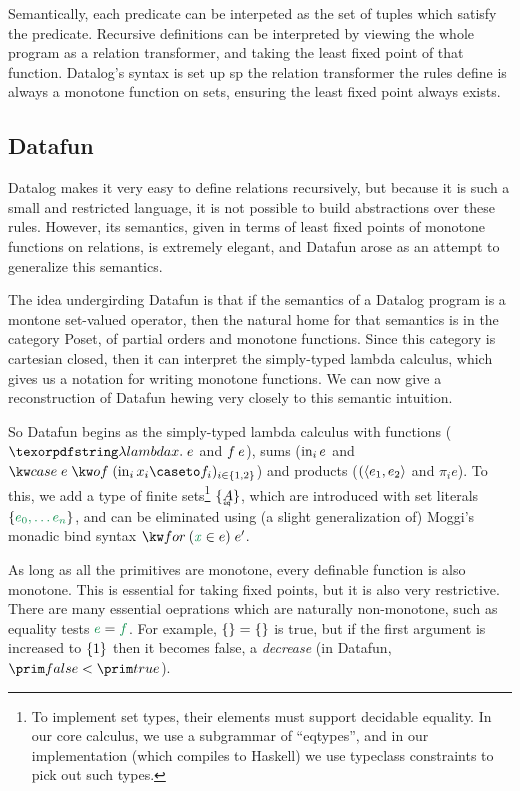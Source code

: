 Semantically, each predicate can be interpeted as the set of tuples
which satisfy the predicate. Recursive definitions can be interpreted
by viewing the whole program as a relation transformer,
and taking the least fixed point of that function. 
Datalog's syntax is set up sp the relation transformer the rules define is
always a monotone function on sets, ensuring the least fixed point
always exists.

\subsection{Datafun}



Datalog makes it very easy to define relations recursively, but
because it is such a small and restricted language, it is not possible
to build abstractions over these rules. However, its semantics, given
in terms of least fixed points of monotone functions on relations,
is extremely elegant, and Datafun arose as an attempt to generalize
this semantics.

The idea undergirding Datafun is that if the semantics of a Datalog
program is a montone set-valued operator, then the natural home for
that semantics is in the category Poset, of partial orders and
monotone functions. Since this category is cartesian closed, then it
can interpret the simply-typed lambda calculus, which gives us a
notation for writing monotone functions. We can now give a
reconstruction of Datafun hewing very closely to this semantic
intuition.

So Datafun begins as the simply-typed lambda calculus with functions ($\fnof{x}{e}$
and $f\<e$), sums ($\mathrm{in}_{i}\, e$ and $\ecase{e} (\inj i x_i \caseto f_i)_{i\in\{1,2\}}$)
and products ($(\langle{e_1, e_2}\rangle$ and $\pi_i e$). To this, we add a type of finite
sets\footnote{To implement set types, their elements must support decidable equality.
  In our core calculus, we use a subgrammar of
  ``eqtypes'', and in our implementation (which compiles to Haskell) we use typeclass
  constraints to pick out such types.}
$\tset{\eqt A}$, which are introduced with set literals $\eset{e_0, \ldots e_n}$, 
and can be eliminated using (a slight generalization of) Moggi's monadic
bind syntax $\efor{x}{e}{e'}$.

As long as all the primitives are monotone, every definable
function is also monotone. This is essential for taking
fixed points, but it is also very restrictive. There are many
essential oeprations which are naturally non-monotone, such as
equality tests $\eeq e f$. For example, $\eset{} = \eset{}$ is true,
but if the first argument is increased to $\{{1}\}$ then it
becomes false, a \emph{decrease} (in Datafun, $\efalse < \etrue$).


